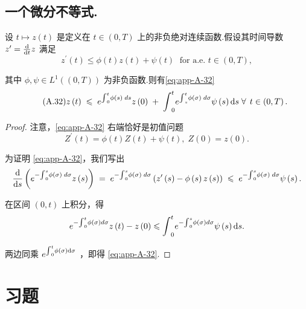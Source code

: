 \subsection{一个微分不等式.}

\begin{theorem}\label{thm:app-A-21}
设 $t \mapsto  z\left( t\right)$ 是定义在 $t \in  \left(  {0,T}\right)$ 上的非负绝对连续函数.假设其时间导数 ${z}^{\prime } = \frac{\mathop{}\!\mathrm{d}}{\mathop{}\!\mathrm{d} t}z$ 满足
\[
{z}^{\prime }\left( t\right)  \leq  \phi \left( t\right) z\left( t\right)  + \psi \left( t\right) \;\text{ for a.e. }t \in  \left(  {0,T}\right)  ,
\]

其中 $\phi ,\psi  \in  {L}^{1}\left( \left(  {0,T}\right)  \right)$ 为非负函数.则有\eqref{eq:app-A-32}
\begin{equation}\tag{A.32}\label{eq:app-A-32}
z\left( t\right) \; \leqslant  \;{e}^{{\int }_{0}^{t}\phi \left( s\right) \;{ds}}z\left( 0\right) \; + \;{\int }_{0}^{t}{e}^{{\int }_{s}^{t}\phi \left( \sigma \right) \;{d\sigma }}\psi \left( s\right){\mathop{}\!\mathrm{d} s}\;\forall\,\;t \in  \left(  {0,T}\right)  .
\end{equation}
\end{theorem}

\begin{proof}
注意，\eqref{eq:app-A-32} 右端恰好是初值问题
\[
{Z}^{\prime }\left( t\right)  = \phi \left( t\right) Z\left( t\right)  + \psi \left( t\right) ,\;Z\left( 0\right)  = z\left( 0\right) .
\]

为证明 \eqref{eq:app-A-32}，我们写出
\[
\frac{\mathop{}\!\mathrm{d}}{\mathop{}\!\mathrm{d} s}\left( {{e}^{-{\int }_{0}^{s}\phi \left( \sigma \right) \;{d\sigma }}z\left( s\right) }\right) \; = \;{e}^{-{\int }_{0}^{s}\phi \left( \sigma \right) \;{d\sigma }}\left( {{z}^{\prime }\left( s\right)  - \phi \left( s\right) z\left( s\right) }\right) \; \leqslant  \;{e}^{-{\int }_{0}^{s}\phi \left( \sigma \right) \;{d\sigma }}\psi \left( s\right) .
\]

在区间 $\left(  {0,t}\right)$ 上积分，得
\[
{e}^{-{\int }_{0}^{t}\phi \left( \sigma \right) {d\sigma }}z\left( t\right)  - z\left( 0\right)  \leqslant  {\int }_{0}^{t}{e}^{-{\int }_{0}^{s}\phi \left( \sigma \right) {d\sigma }}\psi \left( s\right) {\mathop{}\!\mathrm{d} s}.
\]

两边同乘 ${e}^{{\int }_{0}^{t}\phi \left( \sigma \right) {\mathop{}\!\mathrm{d} \sigma }}$ ，即得 \eqref{eq:app-A-32}.
\end{proof}

\section{习题}

